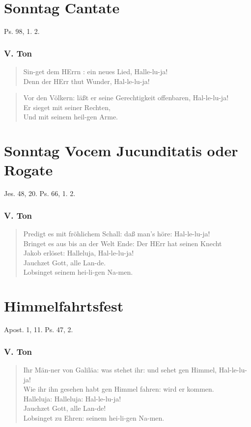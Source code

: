 \section{Sonntag Cantate}

Ps. 98, 1. 2.

\subsubsection{V. Ton}
\begin{verse}
Sin-get dem HErrn : ein neues Lied, Halle-lu-ja!\\
Denn der HErr thut Wunder, Hal-le-lu-ja!
\end{verse}

\begin{verse}
Vor den Völkern: läßt er seine Gerechtigkeit offenbaren, Hal-le-lu-ja!\\
Er sieget mit seiner Rechten,\\
Und mit seinem heil-gen Arme.
\end{verse}

\section{Sonntag Vocem Jucunditatis oder Rogate}

Jes. 48, 20. Ps. 66, 1. 2.

\subsubsection{V. Ton}
\begin{verse}
Predigt es mit fröhlichem Schall: daß man’s höre: Hal-le-lu-ja!\\
Bringet es aus bis an der Welt Ende: Der HErr hat seinen Knecht\\
Jakob erlöset: Halleluja, Hal-le-lu-ja!\\
Jauchzet Gott, alle Lan-de.\\
Lobsinget seinem hei-li-gen Na-men.
\end{verse}

\section{Himmelfahrtsfest}

Apost. 1, 11. Ps. 47, 2.

\subsubsection{V. Ton}
\begin{verse}
Ihr Män-ner von Galiläa: was stehet ihr: und sehet gen Himmel, Hal-le-lu-ja!\\
Wie ihr ihn gesehen habt gen Himmel fahren: wird er kommen.\\
Halleluja: Halleluja: Hal-le-lu-ja!\\
Jauchzet Gott, alle Lan-de!\\
Lobsinget zu Ehren: seinem hei-li-gen Na-men.
\end{verse}

